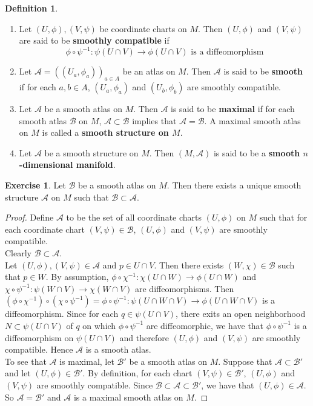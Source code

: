 \documentclass[12pt]{amsart}
\theoremstyle{definition}
\newtheorem{defn}[definition]{Definition}
\newtheorem{ex}[definition]{Exercise}
\newcommand{\MA}{\mathcal{A}}
\newcommand{\MB}{\mathcal{B}}
\begin{document}
	\begin{defn}\
		\begin{enumerate}
			\item Let $(U, \phi), (V, \psi)$ be coordinate charts on $M$. Then $(U, \phi)$ and $(V, \psi)$ are said to be \textbf{smoothly compatible} if $$\phi \circ \psi^{-1}: \psi(U \cap V) \rightarrow \phi (U \cap V) \text{ is a diffeomorphism}$$ 
			\item Let $\MA = ((U_a,\phi_{a}))_{a \in A}$ be an atlas on $M$. Then $\MA$ is said to be \textbf{smooth} if for each $a,b \in A$, $(U_a,\phi_{a})$ and $(U_b,\phi_{b})$ are smoothly compatible.
			\item Let $\MA$ be a smooth atlas on $M$. Then $\MA$ is said to be \textbf{maximal} if for each smooth atlas $\MB$ on $M$, $\MA \subset \MB$ implies that $\MA = \MB$. A maximal smooth atlas on $M$ is called a \textbf{smooth structure on $M$}.
			\item Let $\MA$ be a smooth structure on $M$. Then $(M, \MA)$ is said to be a \textbf{smooth $n$-dimensional manifold}. 
		\end{enumerate}
	\end{defn}

	\begin{ex}
		Let $\MB$ be a smooth atlas on $M$. Then there exists a unique smooth structure $\MA$ on $M$ such that $\MB \subset \MA$.
	\end{ex}

	\begin{proof}
		Define $\MA$ to be the set of all coordinate charts $(U, \phi)$ on $M$ such that for each coordinate chart $(V, \psi) \in \MB$,  $(U, \phi)$ and $(V, \psi) $ are smoothly compatible. \\
		Clearly $\MB \subset \MA$. \\
		Let $(U, \phi), (V, \psi) \in \MA$ and $p \in U \cap V$. Then there exists $(W, \chi) \in \MB$ such that $p \in W$. By assumption, $\phi \circ \chi^{-1} : \chi(U \cap W) \rightarrow \phi(U \cap W)$ and $ \chi \circ \psi^{-1} : \psi(W \cap V) \rightarrow \chi(W \cap V)$ are diffeomorphisms. Then $ (\phi \circ \chi^{-1}) \circ (\chi \circ \psi^{-1}) = \phi \circ \psi^{-1}: \psi(U \cap W \cap V) \rightarrow  \phi(U \cap W \cap V) $ is a diffeomorphism.  Since for each $q \in \psi(U \cap V)$, there exits an open neighborhood $N \subset \psi(U \cap V)$ of $q$ on which $\phi \circ \psi^{-1}$ are diffeomorphic, we have that $\phi \circ \psi^{-1}$ is a diffeomorphism on $\psi(U \cap V)$ and therefore $(U, \phi)$ and $ (V, \psi)$ are smoothly compatible. Hence $\MA$ is a smooth atlas.\\
		To see that $\MA$ is maximal, let $\MB'$ be a smooth atlas on $M$. Suppose that $\MA \subset \MB'$ and let $(U, \phi) \in \MB'$. By definition, for each chart $(V, \psi) \in \MB'$, $(U, \phi)$ and $(V, \psi)$ are smoothly compatible. Since $\MB \subset \MA \subset \MB'$, we have that $(U, \phi) \in \MA$. So $\MA = \MB'$ and $\MA$ is a maximal smooth atlas on $M$.
	\end{proof}
\end{document}
